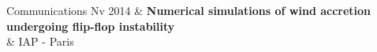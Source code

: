\documentclass[a4paper,oneside]{cv}
\newcommand{\activite}[1]{\textbf{#1}\ }
\begin{document}
{{\begin{minipage}{1.0\textwidth}
\begin{rubriquetableau}[1.7cm]{Communications}
\hspace*{0.4cm}Nv 2014
        & \activite{\hspace*{0.4cm}Numerical simulations of wind accretion undergoing flip-flop instability}\\        
        & \hspace*{0.4cm}IAP - Paris\\ \\ 

\vspace{0,8cm}
                              
\end{rubriquetableau}

\end{minipage}
}
}

\clearpage 
%
\end{document}
